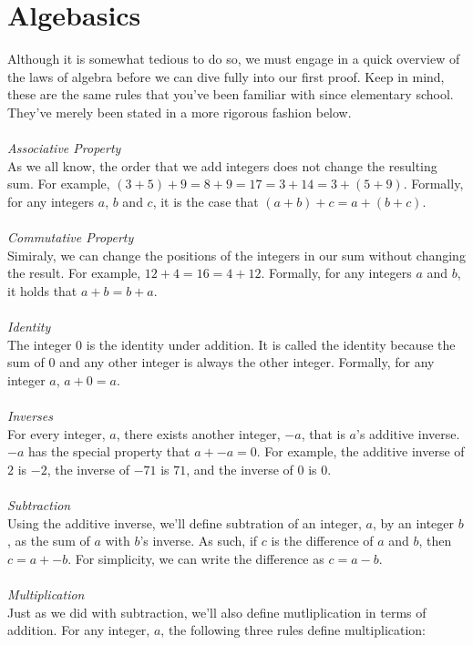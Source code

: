 \documentclass[a4paper,12pt]{article}
\begin{document}
\section{Algebasics}
Although it is somewhat tedious to do so, we must engage in a quick overview of the laws of algebra before we can dive fully into our first proof. Keep in mind, these are the same rules that you've been familiar with since elementary school. They've merely been stated in a more rigorous fashion below.\\
\\
\textit{Associative Property}\\
As we all know, the order that we add integers does not change the resulting sum. For example, $(3 + 5) + 9 = 8 + 9 = 17 = 3 + 14 = 3 + (5 + 9)$. Formally, for any integers $a$, $b$ and $c$, it is the case that $(a + b) + c = a + (b + c)$.\\
\\
\textit{Commutative Property}\\
Simiraly, we can change the positions of the integers in our sum without changing the result. For example, $12 + 4 = 16 = 4 + 12$. Formally, for any integers $a$ and $b$, it holds that $a + b = b + a$.\\
\\
\textit{Identity}\\
The integer $0$ is the identity under addition. It is called the identity because the sum of $0$ and any other integer is always the other integer. Formally, for any integer $a$, $a + 0 = a$.\\
\\
\textit{Inverses}\\
For every integer, $a$, there exists another integer, $-a$, that is $a$'s additive inverse. $-a$ has the special property that $a + -a = 0$. For example, the additive inverse of $2$ is $-2$, the inverse of $-71$ is $71$, and the inverse of $0$ is $0$.\\ 
\\
\textit{Subtraction}\\
Using the additive inverse, we'll define subtration of an integer, $a$, by an integer $b$, as the sum of $a$ with $b$'s inverse. As such, if $c$ is the difference of $a$ and $b$, then $c = a + -b$. For simplicity, we can write the difference as $c = a - b$.\\
\\
\textit{Multiplication}\\
Just as we did with subtraction, we'll also define mutliplication in terms of addition. For any integer, $a$, the following three rules define multiplication:
\end{document}
